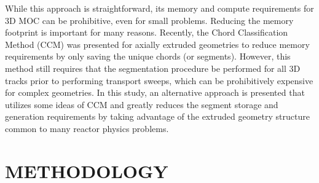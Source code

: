 

While this approach is straightforward, its memory and compute requirements for 3D MOC can be prohibitive, even for small problems. Reducing the memory footprint is important for many reasons. Recently, the Chord Classification Method (CCM) \cite{Sciannandrone2015} was presented for axially extruded geometries to reduce memory requirements by only saving the unique chords (or segments).  However, this method still requires that the segmentation procedure be performed for all 3D tracks prior to performing transport sweeps, which can be prohibitively expensive for complex geometries. In this study, an alternative approach is presented that utilizes some ideas of CCM and greatly reduces the segment storage and generation requirements by taking advantage of the extruded geometry structure common to many reactor physics problems.

\section{METHODOLOGY}

